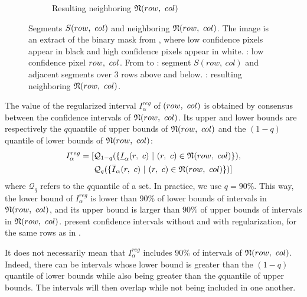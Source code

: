\begin{figure}
\begin{subfigure}[t]{0.5\linewidth}
        \caption{Resulting neighboring $\mathfrak{N}(row, ~col)$}
        \label{fig:low_confidence_segments_6}
    \end{subfigure}
    \caption{Segments $S(row, ~col)$ and neighboring $\mathfrak{N}(row, ~col)$. The image is an extract of the binary mask from , where low confidence pixels appear in black and high confidence pixels appear in white. : low confidence pixel $row, ~col$. From  to : segment $S(row, ~ col)$ and adjacent segments over $3$ rows above and below. : resulting neighboring $\mathfrak{N}(row, ~col)$.}
    \label{fig:low_confidence_segments}
\end{figure}

The value of the regularized interval $I^{reg}_\alpha$ of $(row, ~col)$ is obtained by consensus between the confidence intervals of $\mathfrak{N}(row, ~col)$. Its upper and lower bounds are respectively the $q$\ith quantile of upper bounds of $\mathfrak{N}(row, ~col)$ and the $(1-q)$\ith quantile of lower bounds of $\mathfrak{N}(row, ~col)$:
\begin{align}
    I^{reg}_\alpha=[&\mathcal{Q}_{1-q}(\{\underline{I}_\alpha(r,~c)~|~(r,~c)\in\mathfrak{N}(row, ~col)\}),\nonumber\\
    &\mathcal{Q}_q(\{\overline{I}_\alpha(r,~c)~|~(r,~c)\in\mathfrak{N}(row, ~col)\})]\label{eq:quantile_reg}
\end{align}
where $\mathcal{Q}_q$ refers to the $q$\ith quantile of a set. In practice, we use $q=90\%$. This way, the lower bound of $I^{reg}_\alpha$ is lower than $90\%$ of lower bounds of intervals in $\mathfrak{N}(row, ~col)$, and its upper bound is larger than $90\%$ of upper bounds of intervals in $\mathfrak{N}(row, ~col)$.  present confidence intervals without and with regularization, for the same rows as in .

\begin{remark}
    It does not necessarily mean that $I^{reg}_\alpha$ includes $90\%$ of intervals of $\mathfrak{N}(row, ~col)$. Indeed, there can be intervals whose lower bound is greater than the $(1-q)$\ith quantile of lower bounds while also being greater than the $q$\ith quantile of upper bounds. The intervals will then overlap while not being included in one another.
\end{remark}

